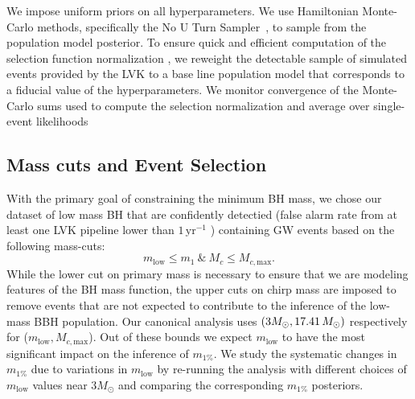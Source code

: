 \documentclass[modern]{aastex631}
\begin{document}
We impose uniform priors on all hyperparameters. We use Hamiltonian Monte-Carlo
methods, specifically the No U Turn Sampler~\citep[NUTS, ][]{HMC, HMC-NUTS}, to
sample from the population model posterior. To ensure quick and efficient
computation of the selection function normalization \citep{Mandel:2018mve}, we
reweight the detectable sample of simulated events provided by the LVK
\citep{KAGRA:2021duu} to a base line population model that corresponds to a
fiducial value of the hyperparameters.  We monitor convergence of the
Monte-Carlo sums used to compute the selection normalization and average over
single-event likelihoods \citep{Pdet1-Farr,Pdet2-essick,Talbot2023}

\subsection{Mass cuts and Event Selection}
With the primary goal of constraining the minimum BH mass, we chose our dataset
of low mass BH that are confidently detectied (false alarm rate from at least
one LVK pipeline lower than $1 \, \mathrm{yr}^{-1}$ \citet{KAGRA:2021duu})
containing GW events based on the following mass-cuts:
\begin{equation}
   m_\mathrm{low}\leq m_1 ~\&~M_c\leq M_{c,\mathrm{max}}.
\end{equation}
While the lower cut on primary mass is necessary to ensure that we are modeling
features of the BH mass function, the upper cuts on chirp mass are
imposed to remove events that are not expected to contribute to the inference of
the low-mass BBH population. Our canonical analysis uses $(3M_{\odot},
17.41 \, M_\odot)$ respectively for ($m_\mathrm{low},
M_{c,\mathrm{max}}$). Out of these bounds we expect $m_\mathrm{low}$ to
have the most significant impact on the inference of $m_{1\%}$. We study the
systematic changes in $m_{1\%}$ due to variations in $m_\mathrm{low}$ by re-running the analysis with different choices of $m_\mathrm{low}$ values near $3M_{\odot}$ and comparing the
corresponding $m_{1\%}$ posteriors.
\end{document}
